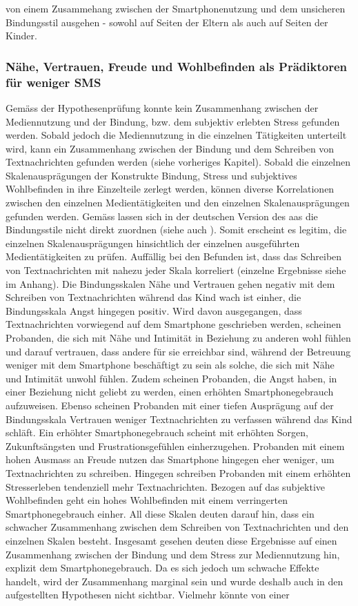 von einem Zusammehang zwischen der Smartphonenutzung und dem unsicheren Bindungsstil ausgehen - sowohl auf Seiten der Eltern als auch auf Seiten der Kinder.

\subsubsection{Nähe, Vertrauen, Freude und Wohlbefinden als Prädiktoren für weniger SMS}
Gemäss der Hypothesenprüfung konnte kein Zusammenhang zwischen der Mediennutzung und der Bindung, bzw. dem subjektiv erlebten Stress gefunden werden. Sobald jedoch die Mediennutzung in die einzelnen Tätigkeiten unterteilt wird, kann ein Zusammenhang zwischen der Bindung und dem Schreiben von Textnachrichten gefunden werden (siehe vorheriges Kapitel). Sobald die einzelnen Skalenausprägungen der Konstrukte Bindung, Stress und subjektives Wohlbefinden in ihre Einzelteile zerlegt werden, können diverse Korrelationen zwischen den einzelnen Medientätigkeiten und den einzelnen Skalenausprägungen gefunden werden. Gemäss  lassen sich in der deutschen Version des \acrshort{aas} die Bindungsstile nicht direkt zuordnen (siehe auch \textit{}). Somit erscheint es legitim, die einzelnen Skalenausprägungen hinsichtlich der einzelnen ausgeführten Medientätigkeiten zu prüfen. Auffällig bei den Befunden ist, dass das Schreiben von Textnachrichten mit nahezu jeder Skala korreliert (einzelne Ergebnisse siehe  im Anhang). Die Bindungsskalen Nähe und Vertrauen gehen negativ mit dem Schreiben von Textnachrichten während das Kind wach ist einher, die Bindungsskala Angst hingegen positiv. Wird davon ausgegangen, dass Textnachrichten vorwiegend auf dem Smartphone geschrieben werden, scheinen Probanden, die sich mit Nähe und Intimität in Beziehung zu anderen wohl fühlen und darauf vertrauen, dass andere für sie erreichbar sind, während der Betreuung weniger mit dem Smartphone beschäftigt zu sein als solche, die sich mit Nähe und Intimität unwohl fühlen. Zudem scheinen Probanden, die Angst haben, in einer Beziehung nicht geliebt zu werden, einen erhöhten Smartphonegebrauch aufzuweisen. Ebenso scheinen Probanden mit einer tiefen Ausprägung auf der Bindungsskala Vertrauen weniger Textnachrichten zu verfassen während das Kind schläft. Ein erhöhter Smartphonegebrauch scheint mit erhöhten Sorgen, Zukunftsängsten und Frustrationsgefühlen einherzugehen. Probanden mit einem hohen Ausmass an Freude nutzen das Smartphone hingegen eher weniger, um Textnachrichten zu schreiben. Hingegen schreiben Probanden mit einem erhöhten Stresserleben tendenziell mehr Textnachrichten. Bezogen auf das subjektive Wohlbefinden geht ein hohes Wohlbefinden mit einem verringerten Smartphonegebrauch einher. All diese Skalen deuten darauf hin, dass ein schwacher Zusammenhang zwischen dem Schreiben von Textnachrichten und den einzelnen Skalen besteht. Insgesamt gesehen deuten diese Ergebnisse auf einen Zusammenhang zwischen der Bindung und dem Stress zur Mediennutzung hin, explizit dem Smartphonegebrauch. Da es sich jedoch um schwache Effekte handelt, wird der Zusammenhang marginal sein und wurde deshalb auch in den aufgestellten Hypothesen nicht sichtbar. Vielmehr könnte von einer 